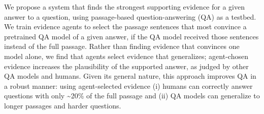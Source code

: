 We propose a system that finds the strongest supporting evidence for a given answer to a question, using passage-based question-answering (QA) as a testbed. We train evidence agents to select the passage sentences that most convince a pretrained QA model of a given answer, if the QA model received those sentences instead of the full passage. Rather than finding evidence that convinces one model alone, we find that agents select evidence that generalizes; agent-chosen evidence increases the plausibility of the supported answer, as judged by other QA models and humans. Given its general nature, this approach improves QA in a robust manner: using agent-selected evidence (i) humans can correctly answer questions with only {\textasciitilde}20\% of the full passage and (ii) QA models can generalize to longer passages and harder questions.